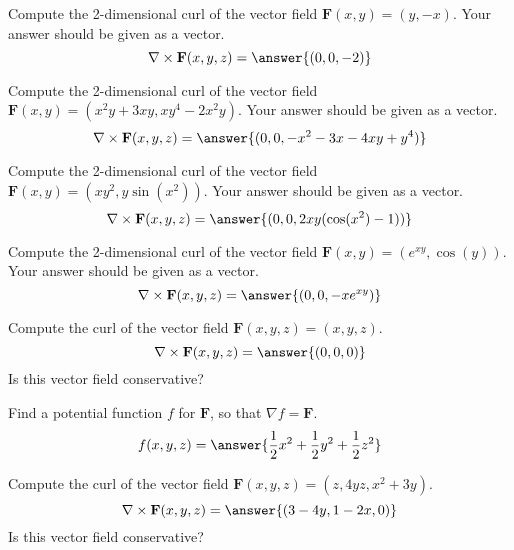 \documentclass{ximera}
\begin{document}
\begin{problem}
Compute the 2-dimensional curl of the vector field $\mathbf{F}(x,y) = (y,-x)$. Your answer should be given as a vector.
\[
\nabla\times\mathbf{F}(x,y,z) = \answer{(0,0,-2)}
\]
\end{problem}

\begin{problem}
Compute the 2-dimensional curl of the vector field $\mathbf{F}(x,y) = (x^2y+3xy,xy^4-2x^2y)$. Your answer should be given as a vector.
\[
\nabla\times\mathbf{F}(x,y,z) = \answer{(0,0,-x^2-3x-4xy+y^4)}
\]
\end{problem}

\begin{problem}
Compute the 2-dimensional curl of the vector field $\mathbf{F}(x,y) = (xy^2,y\sin(x^2))$. Your answer should be given as a vector.
\[
\nabla\times\mathbf{F}(x,y,z) = \answer{(0,0,2xy(\cos(x^2)-1))}
\]
\end{problem}

\begin{problem}
Compute the 2-dimensional curl of the vector field $\mathbf{F}(x,y) = (e^{xy},\cos(y))$. Your answer should be given as a vector.
\[
\nabla\times\mathbf{F}(x,y,z) = \answer{(0,0,-xe^{xy})}
\]
\end{problem}


\begin{problem}
Compute the curl of the vector field $\mathbf{F}(x,y,z) = (x,y,z)$.
\[
\nabla\times\mathbf{F}(x,y,z) = \answer{(0,0,0)}
\]
Is this vector field conservative?
\begin{multipleChoice}
\end{multipleChoice}
\begin{problem}
Find a potential function $f$ for $\mathbf{F}$, so that $\nabla f = \mathbf{F}$.
\[
f(x,y,z) = \answer{\frac{1}{2}x^2+\frac{1}{2}y^2+\frac{1}{2}z^2}
\]
\end{problem}
\end{problem}

\begin{problem}
Compute the curl of the vector field $\mathbf{F}(x,y,z) = (z,4yz,x^2+3y)$.
\[
\nabla\times\mathbf{F}(x,y,z) = \answer{(3-4y,1-2x,0)}
\]
Is this vector field conservative?
\begin{multipleChoice}
\end{multipleChoice}
\end{problem}
\end{document}
